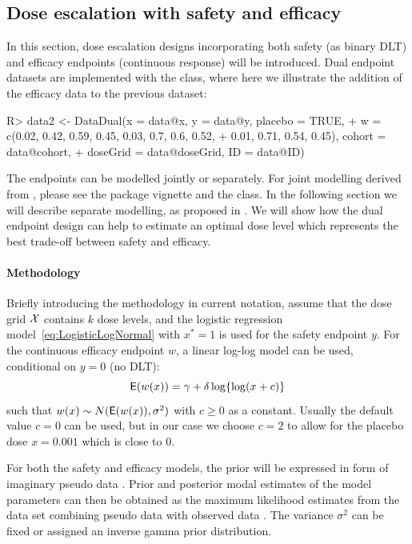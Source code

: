 \documentclass[article]{jss}\usepackage[]{graphicx}\usepackage[]{color}
\begin{document}
\subsection{Dose escalation with safety and efficacy}
\label{subsec:dualendpoint}

In this section, dose escalation designs incorporating both safety (as binary DLT) and efficacy endpoints (continuous response) will be introduced. Dual endpoint datasets are implemented with the  class, where here we illustrate
the addition of the efficacy data  to the previous dataset:
\begin{Schunk}
\begin{Sinput}
R> data2 <- DataDual(x = data@x, y = data@y, placebo = TRUE,
+                    w = c(0.02, 0.42, 0.59, 0.45, 0.03, 0.7, 0.6, 0.52, 
+                          0.01, 0.71, 0.54, 0.45), cohort = data@cohort, 
+                    doseGrid = data@doseGrid, ID = data@ID)
\end{Sinput}
\end{Schunk}
The endpoints can be modelled jointly or separately. For joint modelling derived from \cite{bekele2005}, please see the package vignette and the  class. In the following section we will describe separate modelling, as proposed in \cite{yeung2015}. We will show how the dual endpoint design can help to estimate an optimal dose level which represents the best trade-off between safety and efficacy. 

\paragraph{Methodology} Briefly introducing the methodology in current notation, assume that the dose grid $\cal{X}$ contains $k$ dose levels, and the logistic regression model~\eqref{eq:LogisticLogNormal} with $x^{*}=1$ is used for the safety endpoint $y$. For the continuous efficacy endpoint $w$, a linear log-log model can be used, conditional on $y=0$ (no DLT):
\begin{equation}\label{eq:loglog}
\mathsf{E}(w(x)) = \gamma + \delta \log\{\log(x + c)\} 
\end{equation}
such that $w(x) \sim N(\mathsf{E}(w(x)), \sigma^2)$ with $c \geq 0$ as a constant. Usually the default value $c=0$ can be used, but in our case we choose $c=2$ to allow for the placebo dose $x=0.001$ which is close to 0. 

For both the safety and efficacy models, the prior will be expressed in form of imaginary pseudo data \citep[see][for details]{yeung2015}. Prior and posterior modal estimates of the model parameters can then be obtained as the maximum likelihood estimates from the data set combining pseudo data with observed data \citep{w06}. The variance $\sigma^{2}$ can be fixed or assigned an inverse gamma prior distribution.
\end{document}
